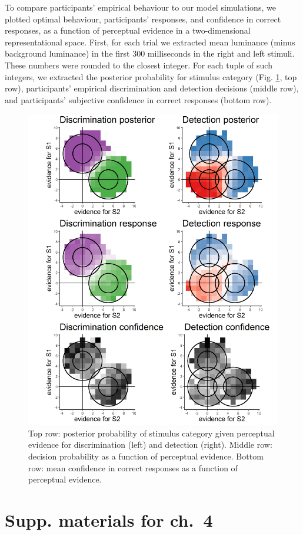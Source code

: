 \documentclass[12pt,twoside]{reedthesis}
\begin{document}
To compare participants' empirical behaviour to our model simulations, we plotted optimal behaviour, participants' responses, and confidence in correct responses, as a function of perceptual evidence in a two-dimensional representational space. First, for each trial we extracted mean luminance (minus background luminance) in the first 300 milliseconds in the right and left stimuli. These numbers were rounded to the closest integer. For each tuple of such integers, we extracted the posterior probability for stimulus category (Fig. \ref{fig:RC-2d-empirical}, top row), participants' empirical discrimination and detection decisions (middle row), and participants' subjective confidence in correct responses (bottom row).
\begin{figure}
\includegraphics[width=0.6\linewidth]{figure/RC/empirical_tile} \caption[Empirical two dimensional probability plots]{Top row: posterior probability of stimulus category given perceptual evidence for discrimination (left) and detection (right). Middle row: decision probability as a function of perceptual evidence. Bottom row: mean confidence in correct responses as a function of perceptual evidence.}\label{fig:RC-2d-empirical}
\end{figure}
\hypertarget{supp.-materials-for-ch.-4}{%
\chapter{Supp. materials for ch.~4}\label{supp.-materials-for-ch.-4}}
\end{document}
